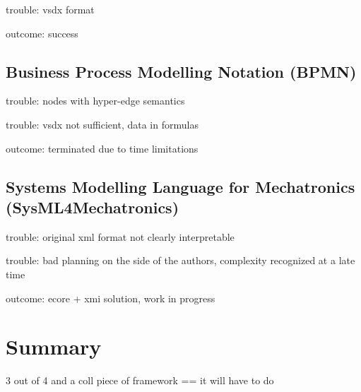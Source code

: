 trouble: vsdx format

outcome: success

\subsection{Business Process Modelling Notation (BPMN)}

trouble: nodes with hyper-edge semantics

trouble: vsdx not sufficient, data in formulas

outcome: terminated due to time limitations

\subsection{Systems Modelling Language for Mechatronics (SysML4Mechatronics)}

trouble: original xml format not clearly interpretable

trouble: bad planning on the side of the authors, complexity recognized at a late time

outcome: ecore + xmi solution, \color{red}work in progress\color{black}

\section{Summary}
\label{sec:results:summary}

3 out of 4 and a coll piece of framework ==
it will have to do